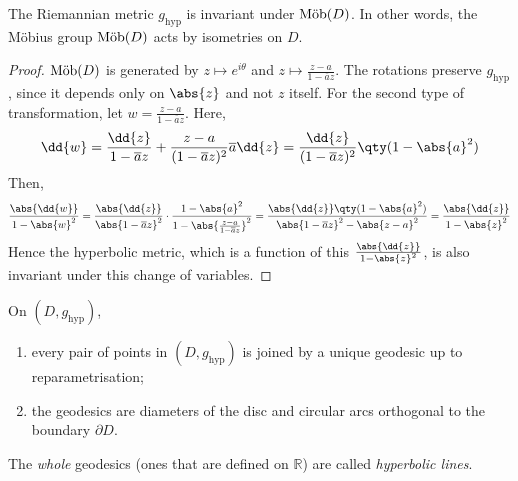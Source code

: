 \begin{lemma}
	The Riemannian metric $g_{\text{hyp}}$ is invariant under $\text{M\"ob}(D)$.
	In other words, the M\"obius group $\text{M\"ob}(D)$ acts by isometries on $D$.
\end{lemma}
\begin{proof}
	$\text{M\"ob}(D)$ is generated by $z \mapsto e^{i\theta}$ and $z \mapsto \frac{z-a}{1-\overline a z}$.
	The rotations preserve $g_{\text{hyp}}$, since it depends only on $\abs{z}$ and not $z$ itself.
	For the second type of transformation, let $w = \frac{z-a}{1-\overline a z}$.
	Here,
	\begin{align*}
		\dd{w} = \frac{\dd{z}}{1-\overline a z} + \frac{z-a}{(1-\overline a z)^2} \overline a \dd{z} = \frac{\dd{z}}{(1-\overline a z)^2} \qty(1 - \abs{a}^2)
	\end{align*}
	Then,
	\begin{align*}
		\frac{\abs{\dd{w}}}{1-\abs{w}^2} = \frac{\abs{\dd{z}}}{\abs{1-\overline a z}^2} \cdot \frac{1 - \abs{a}^2}{1-\abs{\frac{z-a}{1-\overline a z}}^2} = \frac{\abs{\dd{z}} \qty(1-\abs{a}^2)}{\abs{1-\overline a z}^2 - \abs{z-a}^2} = \frac{\abs{\dd{z}}}{1-\abs{z}^2}
	\end{align*}
	Hence the hyperbolic metric, which is a function of this $\frac{\abs{\dd{z}}}{1-\abs{z}^2}$, is also invariant under this change of variables.
\end{proof}
\begin{lemma}
	On $(D, g_{\text{hyp}})$,
	\begin{enumerate}
		\item every pair of points in $(D, g_{\text{hyp}})$ is joined by a unique geodesic up to reparametrisation;
		\item the geodesics are diameters of the disc and circular arcs orthogonal to the boundary $\partial D$.
	\end{enumerate}
	The \textit{whole} geodesics (ones that are defined on $\mathbb R$) are called \textit{hyperbolic lines}.
\end{lemma}
